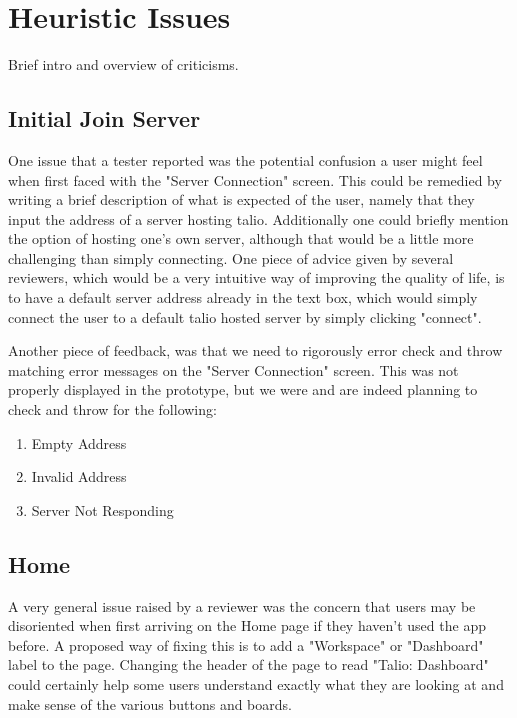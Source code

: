 \section{Heuristic Issues}

Brief intro and overview of criticisms.

\subsection{Initial Join Server}

    One issue that a tester reported was the potential confusion a user might feel when first faced with the "Server Connection" screen. This could be remedied by writing a brief description of what is expected of the user, namely that they input the address of a server hosting talio. Additionally one could briefly mention the option of hosting one's own server, although that would be a little more challenging than simply connecting. One piece of advice given by several reviewers, which would be a very intuitive way of improving the quality of life, is to have a default server address already in the text box, which would simply connect the user to a default talio hosted server by simply clicking "connect".

    Another piece of feedback, was that we need to rigorously error check and throw matching error messages on the "Server Connection" screen. This was not properly displayed in the prototype, but we were and are indeed planning to check and throw for the following:
\begin{enumerate}
    \item Empty Address
    \item Invalid Address
    \item Server Not Responding
\end{enumerate}

\subsection{Home}

    A very general issue raised by a reviewer was the concern that users may be disoriented when first arriving on the Home page if they haven't used the app before. A proposed way of fixing this is to add a "Workspace" or "Dashboard" label to the page. Changing the header of the page to read "Talio: Dashboard" could certainly help some users understand exactly what they are looking at and make sense of the various buttons and boards.


